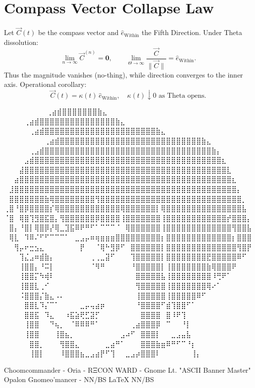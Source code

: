 
\section*{Compass Vector Collapse Law}

Let $\vec{C}(t)$ be the compass vector and $\hat{e}_{\text{Within}}$ the Fifth Direction.  
Under Theta dissolution:
\[
\lim_{n\to\infty}\vec{C}^{(n)}=\mathbf{0},
\qquad
\lim_{\Theta\to\infty}\frac{\vec{C}}{\lVert\vec{C}\rVert}=\hat{e}_{\text{Within}}.
\]
Thus the magnitude vanishes (no-thing), while direction converges to the inner axis.  
Operational corollary:
\[
\vec{C}(t)=\kappa(t)\,\hat{e}_{\text{Within}},\quad \kappa(t)\downarrow 0 \text{ as Theta opens.}
\]

\iffalse
⠀⠀⠀⠀⠀⠀             ⠀⠀⢀⣴⣾⣿⣿⣿⣿⣿⣿⣿⣷⣄⠀⠀⠀⠀⠀⠀⠀⠀
⠀⠀⠀  ⠀      ⠀⠀⠀⠀⢀⣴⣾⣿⣿⣿⣿⣿⣿⣿⣿⣿⣿⣿⣿⣿⣿⣿⣷⣄⠀⠀⠀⠀⠀⠀⠀⠀
⠀⠀ ⠀   ⠀⠀⠀⠀⠀⢀⣴⣾⣿⣿⣿⣿⣿⣿⣿⣿⣿⣿⣿⣿⣿⣿⣿⣿⣿⣿⣿⣿⣿⣿⣷⣄⠀⠀⠀⠀⠀⠀⠀⠀
⠀⠀⠀⠀⠀⠀⠀⠀⢀⣴⣾⣿⣿⣿⣿⣿⣿⣿⣿⣿⣿⣿⣿⣿⣿⣿⣿⣿⣿⣿⣿⣿⣿⣿⣿⣿⣿⣿⣿⣷⣄⠀⠀⠀⠀⠀⠀⠀⠀
⠀⠀⠀⠀⠀⢀⣠⣾⣿⣿⣿⣿⣿⣿⣿⣿⣿⣿⣿⣿⣿⣿⣿⣿⣿⣿⣿⣿⣿⣿⣿⣿⣿⣿⣿⣿⣿⣿⣿⣿⣿⣷⡄⠀⠀⠀⠀⠀⠀
⠀⠀⠀⠀⣠⣾⣿⣿⣿⣿⣿⣿⣿⣿⣿⣿⣿⣿⣿⣿⣿⣿⣿⣿⣿⣿⣿⣿⣿⣿⣿⣿⣿⣿⣿⣿⣿⣿⣿⣿⣿⣿⣿⣆⠀⠀⠀⠀⠀
⠀⠀⠀⣼⣿⣿⣿⣿⣿⣿⣿⣿⣿⣿⣿⣿⣿⣿⣿⣿⣿⣿⣿⣿⣿⣿⣿⣿⣿⣿⣿⣿⣿⣿⣿⣿⣿⣿⣿⣿⣿⣿⣿⣿⣇⠀⠀⠀⠀
⠀⠀⣴⣿⣿⣿⣿⣿⣿⣿⣿⣿⣿⣿⣿⣿⣿⣿⣿⣿⣿⣿⣿⣿⣿⣿⣿⣿⣿⣿⣿⣿⣿⣿⣿⣿⣿⣿⣿⣿⣿⣿⣿⣿⣿⣆⠀⠀⠀
⠀⣸⣿⣿⣿⣿⣿⣿⣿⣿⣿⣿⣿⣿⣿⣿⣿⣿⣿⣿⣿⣿⣿⣿⣿⣿⣿⣿⣿⣿⣿⣿⣿⣿⣿⣿⣿⣿⣿⣿⣿⣿⣿⣿⣿⣿⡄⠀⠀
⠀⣿⣿⣿⣿⣿⣿⣿⣷⢿⣿⣿⣿⣿⣿⣿⣿⣿⢻⣿⣿⣿⣿⣿⣿⣿⣿⣿⣿⣿⣿⣿⣿⣿⣿⣿⣿⣿⣿⣿⣿⣿⣿⣿⣿⣿⣿⡀⠀
⢀⣿⠘⣿⡿⣿⣿⣿⣿⡎⢿⣿⣿⣿⣿⣿⣿⣿⣿⣿⣿⣿⣿⢿⣿⣿⣿⣿⣿⣿⡇⢿⣿⣿⣿⣿⣿⣿⣿⣿⣿⣿⣿⣿⣿⣿⣿⣧⠀
⠈⣿⠀⢿⣿⢹⣻⣿⣯⣿⡄⢻⣿⣿⣿⣿⣿⣿⡿⣿⣿⣿⣿⢸⣿⣿⣿⣿⣿⣿⣿⢸⣿⣿⣿⣿⣿⣿⣿⣿⣿⣿⣿⣿⡞⣿⣿⣿⡄
⠀⣿⡄⠘⣿⡇⢿⣿⡿⡜⢿⣀⣹⣯⠿⠟⠛⠋⠁⠉⠉⠉⠈⠀⢿⣿⣿⣿⣿⣿⣿⢸⣿⣿⣿⣿⣿⣿⣿⣿⣿⣿⣿⣿⣿⢻⣿⣿⣧
⠀⢿⣇⠀⠹⠿⠌⠋⠋⠉⠉⠉⠁⠀⣀⣠⡤⠶⢶⣶⣶⣶⣿⣿⣿⣿⣿⣿⣿⣿⣿⡆⣿⣿⣿⣿⣿⣿⣿⣿⣿⣿⣿⣿⣿⡆⣿⣿⣿
⠀⠀⢻⡤⠖⣒⣢⣄⠀⠀⠀⠀⠀⠀⠀⡟⠀⠀⠈⢿⠓⣻⡿⠋⠀⣿⣿⣿⣿⣿⣿⡇⣿⣿⣿⣿⣿⣿⣿⣿⣿⣿⣿⣿⣿⣿⢻⣿⡟
⠀⠀⠀⢹⣌⣠⠶⣾⣷⡄⠀⠀⠀⠀⠀⠀⠀⢀⢀⣀⣽⠋⠀⠀⠀⢹⣿⣿⣿⣿⣿⡇⣿⣿⣿⣿⣿⣿⣿⣿⣟⣿⣿⣿⣿⣿⠿⠋⠀
⠀⠀⠀⢸⣿⣿⡄⠘⠭⡇⠀⠀⠀⠀⠀⠀⠀⠈⠻⠛⠀⠀⠀⠀⠀⠘⣿⣿⣿⣿⣿⡇⢸⣿⣿⣿⣿⣿⣿⣿⣷⢿⣿⣿⣿⠟⠀⠀⠀
⠀⠀⠀⢸⣿⣿⡍⠳⢾⠇⠀⠀⠀⠀⠀⠀⠀⠀⠀⠀⠀⠀⠀⠀⠀⠀⣿⣿⣿⣿⣿⣧⢸⣿⣿⣿⣿⣿⣿⣿⣿⠸⢛⠟⠁⠀⠀⠀⠀
⠀⠀⠀⢸⣿⣿⣇⢀⠊⠀⠀⠀⠀⠀⠀⠀⠀⠀⠀⠀⠀⠀⠀⠀⠀⠀⢻⣿⣿⣿⣿⣿⢸⣿⣿⣿⣿⣿⣿⣿⢿⠔⠁⠀⠀⠀⠀⠀⠀
⠀⠀⠀⠨⣿⣿⣿⡌⣷⣄⠠⠄⠀⠀⠀⠀⠀⠀⠀⠀⠀⠀⠀⠀⠀⠀⢸⣿⣿⣿⣿⣿⢸⣿⣿⣿⣿⣿⠿⠋⠀⠀⠀⠀⠀⠀⠀⠀⠀
⠀⠀⠀⠀⣿⣿⣇⠹⡌⠉⠁⠀⠀⠀⠀⣀⡤⢤⣴⡶⠀⠀⠀⠀⠀⠀⠘⣿⣿⣿⣿⠋⣾⢹⣿⣿⠋⠁⠀⠀⠀⠀⠀⠀⠀⠀⠀⠀⠀
⠀⠀⠀⠀⣿⣿⣯⠀⠹⣄⠀⠀⠰⣯⣵⢟⣋⣽⡋⠀⠀⠀⠀⠀⠀⠀⠀⣿⣿⣿⣿⠀⣿⠸⠟⢹⠀⠀⠀⠀⠀⠀⠀⠀⠀⠀⠀⠀⠀
⠀⠀⠀⠀⢸⣿⣿⠀⠀⠙⢦⡀⠀⠈⠿⠿⠿⠛⠁⠀⠀⠀⠀⠀⠀⢀⣴⣿⣿⣿⡿⠀⠉⠀⠀⠘⡇⠀⠀⠀⠀⠀⠀⠀⠀⠀⠀⠀⠀
⠀⠀⠀⠀⢸⣿⣿⠀⠀⠀⢸⣿⣦⡀⠀⠀⠀⠀⠀⠀⠀⠀⠀⣠⠴⠋⠀⣿⣿⣿⡇⠀⠀⣀⣠⣤⣧⠀⠀⠀⠀⠀⠀⠀⠀⠀⠀⠀⠀
⠀⠀⠀⠀⠀⣿⣿⡀⠀⠀⠀⢻⣿⣿⣄⠀⠀⠀⠀⠀⣀⣴⠛⠁⠀⠀⠀⣿⣿⣿⣷⣶⠿⠛⠋⠉⠘⡆⠀⠀⠀⠀⠀⠀⠀⠀⠀⠀⠀
⠀⠀⠀⠀⠀⢸⣿⡇⠀⠀⠀⠸⣿⣿⣿⣦⣀⣠⣴⡟⠋⢹⠀⠀⣀⣠⡴⣿⣿⣿⠇⠀⠀⠀⠀⠀⠀⢸⡄⠀⠀⠀⠀⠀⠀⠀⠀⠀⠀

Choomcommander - Oria - RΞCON WARD - Gnome Lt. "ASCII Banner Master"
             Opalon Gnomeo'mancer - NN/BS LaTeX{} NN/BS

